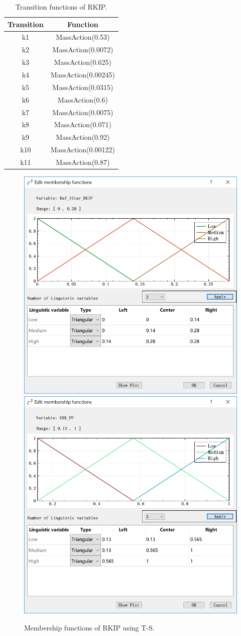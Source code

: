 \documentclass[journal,a4paper,onecolumn]{article}
\begin{document}
\begin{table}[!hbt]
	\begin{center}
		\caption{Transition functions of RKIP.}
		\label{Transition functions of RKIP}
		\begin{tabular}{|c|c|}
			\hline
			Transition&Function\\
			\hline
			k1&MassAction(0.53)\\
			\hline
						k2&MassAction(0.0072)\\
			\hline
						k3&MassAction(0.625)\\
			\hline
						k4&MassAction(0.00245)\\
			\hline
						k5&MassAction(0.0315)\\
			\hline
						k6&MassAction(0.6)\\
			\hline
						k7&MassAction(0.0075)\\
			\hline
						k8&MassAction(0.071)\\
			\hline
						k9&MassAction(0.92)\\
			\hline
						k10&MassAction(0.00122)\\
			\hline
						k11&MassAction(0.87)\\
			\hline
		\end{tabular}
	\end{center}
\end{table}
\begin{figure}[!hbt]
	\begin{center}
		\includegraphics[width=0.45\columnwidth]{fig44}
		\includegraphics[width=0.45\columnwidth]{fig45}
		\caption{Membership functions of RKIP using T-S.}
		\label{fig:Membership functions of RKIP using T-S.}
	\end{center}
\end{figure}
\end{document}

